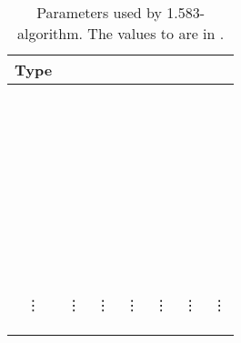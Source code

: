 {\small
	\newpage
	\begin{longtable}{|c|c|c|c|c|c|c|}
		\hline
		Type  &  &  &  &  &  &  \\ 
		\hline \endhead 
		 &  &  &  &  &  &  \\ 
		\hline
		 &  &  &  &  &  &  \\  \hline
		 &  &  &  &  &  &  \\ \hline
		 &  &  &  &  &  &  \\ \hline
		 &  &  &  &  &  &  \\  \hline
		 &  &  &  &  &  &  \\ \hline
		 &  &  &  &  &  &  \\ \hline
		 &  &  &  &  &  &  \\ \hline
		 &  &  &  &  &  &  \\ \hline
		 &  &  &  &  &  &  \\ \hline
		 &  &  &  &  &  &  \\ \hline
		 &  &  &  &  &  &  \\ \hline
		 &  &  &  &  &  &  \\ \hline
		 &  &  &  &  &  &  \\ \hline
		 &  &  &  &  &  &  \\  \hline
		 &  &  &  &  &  &  \\ \hline
		 &  &  &  &  &  &  \\ \hline
		 &  &  &  &  &  &  \\ \hline
		 &  &  &  &  &  &  \\ \hline
		 &  &  &  &  &  &  \\ \hline
		 &  &  &  &  &  &  \\ \hline
		 &  &  &  &  &  &  \\ \hline
		 &  &  &  &  &  &  \\ \hline
		 &  &  &  &  &  & \\ \hline
		 &  &  &  &  &  &  \\ \hline
		 &  &  &  &  &  &  \\ \hline
		 &  &  &  &  &  &  \\ \hline
		 &  &  &  &  &  &  \\ \hline
		 &  &  &  &  &  &  \\ \hline
		 &  &  &  &  &  &  \\ \hline
		 &  &  &  &  &  &  \\ \hline
		 &  &  &  &  &  &  \\ \hline
		 &  &  &  &  &  &  \\ \hline
		 &  &  &  &  &  &  \\ \hline
		 &  &  &  &  &  &  \\ \hline
		 &  &  &  &  &  &  \\ \hline
		 &  &  &  &  &  &  \\ \hline
		 &  &  &  &  &  &  \\ \hline
		\vdots & \vdots & \vdots & \vdots & \vdots & \vdots & \vdots \\ \hline
		 &  &  &  &  &  &  \\ \hline
		 &  &  &  &  &  &  \\ \hline
		\caption{Parameters used by 1.583-algorithm. The values  to  are in .}
		\label{tab:sonofh_all_parameters}
	\end{longtable}
}


